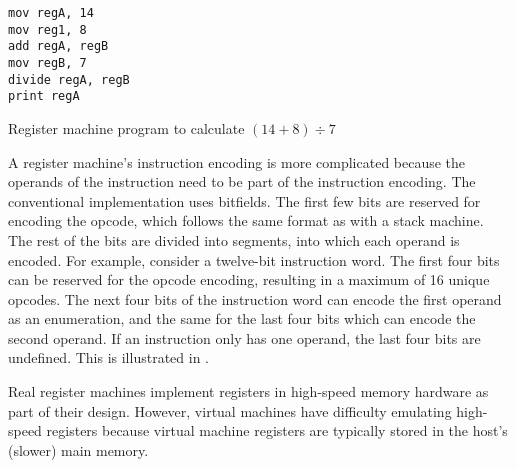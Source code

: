 			\begin{doublefig}
				\begin{halffig}
					\begin{lstlisting}
mov regA, 14
mov reg1, 8
add regA, regB
mov regB, 7
divide regA, regB
print regA
					\end{lstlisting}
					\caption{Register machine program to calculate $(14+8)\div7$}
					\label{fig:registerprogram}
				\end{halffig}
			\end{doublefig}
			
			A register machine's instruction encoding is more complicated because the operands of the instruction need to be part of the instruction encoding. The conventional implementation uses bitfields. The first few bits are reserved for encoding the opcode, which follows the same format as with a stack machine. The rest of the bits are divided into segments, into which each operand is encoded. For example, consider a twelve-bit instruction word. The first four bits can be reserved for the opcode encoding, resulting in a maximum of 16 unique opcodes. The next four bits of the instruction word can encode the first operand as an enumeration, and the same for the last four bits which can encode the second operand. If an instruction only has one operand, the last four bits are undefined. This is illustrated in .
			
			Real register machines implement registers in high-speed memory hardware as part of their design. However, virtual machines have difficulty emulating high-speed registers because virtual machine registers are typically stored in the host's (slower) main memory.
			
